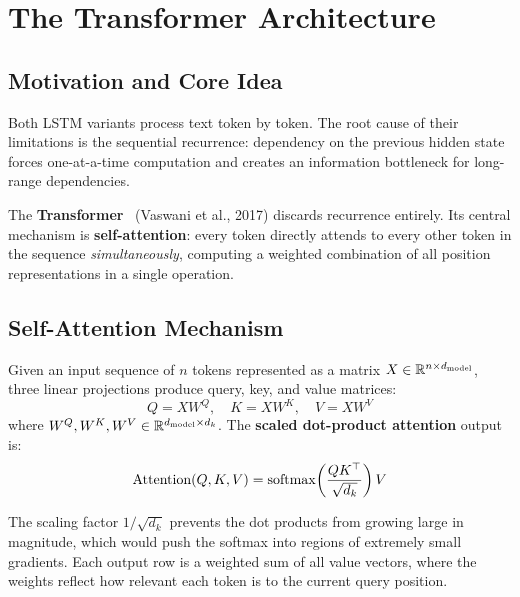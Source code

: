 \section{The Transformer Architecture}
\label{sec:transformer}

\subsection{Motivation and Core Idea}

Both LSTM variants process text token by token. The root cause of their
limitations is the sequential recurrence: dependency on the previous hidden
state forces one-at-a-time computation and creates an information bottleneck for
long-range dependencies.

The \textbf{Transformer}~\cite{vaswani2017attention} (Vaswani et al., 2017)
discards recurrence entirely. Its central mechanism is \textbf{self-attention}:
every token directly attends to every other token in the sequence
\emph{simultaneously}, computing a weighted combination of all position
representations in a single operation.

\subsection{Self-Attention Mechanism}
\label{subsec:selfattn}

Given an input sequence of $n$ tokens represented as a matrix
$X \in \mathbb{R}^{n \times d_{\text{model}}}$, three linear projections produce query,
key, and value matrices:
\begin{equation}
  Q = X W^Q, \quad K = X W^K, \quad V = X W^V
  \label{eq:qkv}
\end{equation}
where $W^Q, W^K, W^V \in \mathbb{R}^{d_{\text{model}} \times d_k}$.
The \textbf{scaled dot-product attention} output is:
\begin{equation}
  \text{Attention}(Q, K, V)
    = \operatorname{softmax}\!\left(\frac{QK^\top}{\sqrt{d_k}}\right) V
  \label{eq:attention}
\end{equation}

The scaling factor $1/\sqrt{d_k}$ prevents the dot products from growing large
in magnitude, which would push the softmax into regions of extremely small
gradients. Each output row is a weighted sum of all value vectors, where the
weights reflect how relevant each token is to the current query position.

